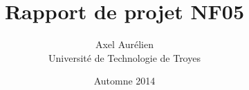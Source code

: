\documentclass[11pt]{report}
\title{Rapport de projet NF05}
\author{Axel \bsc{Mousset} Aurélien \bsc{Labate} \\ Université de Technologie de Troyes}
\date{Automne 2014}
\begin{document}
    \maketitle
    \tableofcontents
    \lstlistoflistings

    
    
    
    
    

    \appendix
    
\end{document}
